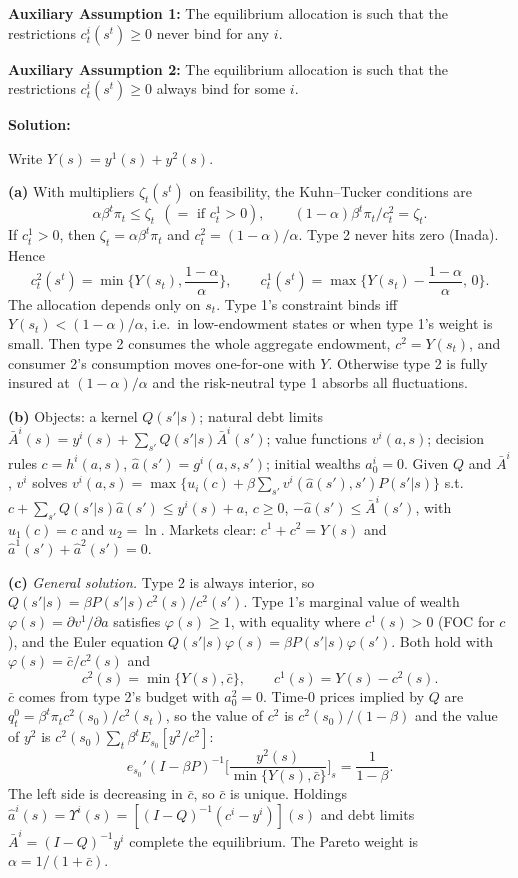 \documentclass[12pt, letterpaper]{article}
\begin{document}
\begin{tcolorbox}[oddbox,title={Exercise 8.27 \quad Corners}]
\begin{tcolorbox}[questionbox]
\textbf{Auxiliary Assumption 1:} The equilibrium allocation is such that the restrictions $c^i_t(s^t)\ge0$ never
bind for any $i$.

\textbf{Auxiliary Assumption 2:} The equilibrium allocation is such that the restrictions $c^i_t(s^t)\ge0$ always
bind for some $i$.
\end{tcolorbox}

\textbf{Solution:}

Write $Y(s)=y^1(s)+y^2(s)$.

\textbf{(a)} With multipliers $\zeta_t(s^t)$ on feasibility, the Kuhn--Tucker conditions are
\[
\alpha\beta^t\pi_t\le\zeta_t\ \ (=\text{ if }c^1_t>0),\qquad(1-\alpha)\beta^t\pi_t/c^2_t=\zeta_t .
\]
If $c^1_t>0$, then $\zeta_t=\alpha\beta^t\pi_t$ and $c^2_t=(1-\alpha)/\alpha$. Type 2 never hits zero (Inada). Hence
\[
\boxed{c^2_t(s^t)=\min\Big\{Y(s_t),\frac{1-\alpha}{\alpha}\Big\},\qquad c^1_t(s^t)=\max\Big\{Y(s_t)-\frac{1-\alpha}{\alpha},\,0\Big\}.}
\]
The allocation depends only on $s_t$. Type 1's constraint binds iff $Y(s_t)<(1-\alpha)/\alpha$, i.e.\ in low-endowment
states or when type 1's weight is small. Then type 2 consumes the whole aggregate endowment, $c^2=Y(s_t)$, and
consumer 2's consumption moves one-for-one with $Y$. Otherwise type 2 is fully insured at $(1-\alpha)/\alpha$ and the
risk-neutral type 1 absorbs all fluctuations.

\textbf{(b)} Objects: a kernel $Q(s'|s)$; natural debt limits $\bar A^i(s)=y^i(s)+\sum_{s'}Q(s'|s)\bar A^i(s')$; value
functions $v^i(a,s)$; decision rules $c=h^i(a,s)$, $\hat a(s')=g^i(a,s,s')$; initial wealths $a^i_0=0$. Given $Q$
and $\bar A^i$, $v^i$ solves
$v^i(a,s)=\max\{u_i(c)+\beta\sum_{s'}v^i(\hat a(s'),s')P(s'|s)\}$ s.t.\ $c+\sum_{s'}Q(s'|s)\hat a(s')\le y^i(s)+a$,
\textbf{$c\ge0$}, $-\hat a(s')\le\bar A^i(s')$, with $u_1(c)=c$ and $u_2=\ln$. Markets clear: $c^1+c^2=Y(s)$ and
$\hat a^1(s')+\hat a^2(s')=0$.

\textbf{(c)} \emph{General solution.} Type 2 is always interior, so $Q(s'|s)=\beta P(s'|s)c^2(s)/c^2(s')$. Type 1's
marginal value of wealth $\varphi(s)=\partial v^1/\partial a$ satisfies $\varphi(s)\ge1$, with equality where
$c^1(s)>0$ (FOC for $c$), and the Euler equation $Q(s'|s)\varphi(s)=\beta P(s'|s)\varphi(s')$. Both hold with
$\varphi(s)=\bar c/c^2(s)$ and
\[
c^2(s)=\min\{Y(s),\bar c\},\qquad c^1(s)=Y(s)-c^2(s).
\]
$\bar c$ comes from type 2's budget with $a^2_0=0$. Time-0 prices implied by $Q$ are $q^0_t=\beta^t\pi_tc^2(s_0)/c^2(s_t)$,
so the value of $c^2$ is $c^2(s_0)/(1-\beta)$ and the value of $y^2$ is $c^2(s_0)\sum_t\beta^tE_{s_0}[y^2/c^2]$:
\[
e_{s_0}'(I-\beta P)^{-1}\Big[\frac{y^2(s)}{\min\{Y(s),\bar c\}}\Big]_s=\frac{1}{1-\beta}. \tag{$\dagger$}
\]
The left side is decreasing in $\bar c$, so $\bar c$ is unique. Holdings $\hat a^i(s)=\Upsilon^i(s)=[(I-Q)^{-1}(c^i-y^i)](s)$
and debt limits $\bar A^i=(I-Q)^{-1}y^i$ complete the equilibrium. The Pareto weight is $\alpha=1/(1+\bar c)$.


\end{tcolorbox}
\end{document}
